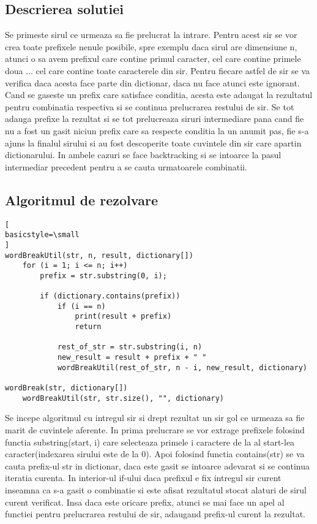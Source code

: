 \documentclass[runningheads]{llncs}
\begin{document}
\subsection{Descrierea solutiei}
Se primeste sirul ce urmeaza sa fie prelucrat la intrare. Pentru acest sir se vor crea toate prefixele nenule posibile, spre exemplu daca sirul
are dimensiune n, atunci o sa avem prefixul care contine primul caracter, cel care contine primele doua ... cel care contine toate caracterele
din sir. Pentru fiecare astfel de sir se va verifica daca acesta face parte din dictionar, daca nu face atunci este ignorant. Cand se gaseste
un prefix care satisface conditia, acesta este adaugat la rezultatul pentru combinatia respectiva si se continua prelucrarea restului de sir.
Se tot adauga prefixe la rezultat si se tot prelucreaza siruri intermediare pana cand fie nu a fost un gasit niciun prefix care sa respecte
conditia la un anumit pas, fie s-a ajuns la finalul sirului si au fost descoperite toate cuvintele din sir care apartin dictionarului. In ambele
cazuri se face backtracking si se intoarce la pasul intermediar precedent pentru a se cauta urmatoarele combinatii.
\subsection{Algoritmul de rezolvare}
\begin{lstlisting}[
basicstyle=\small
]
wordBreakUtil(str, n, result, dictionary[])
	for (i = 1; i <= n; i++)
		prefix = str.substring(0, i);

		if (dictionary.contains(prefix))
			if (i == n)
				print(result + prefix)
				return

			rest_of_str = str.substring(i, n)
			new_result = result + prefix + " "
			wordBreakUtil(rest_of_str, n - i, new_result, dictionary)

wordBreak(str, dictionary[])
	wordBreakUtil(str, str.size(), "", dictionary)
\end{lstlisting}
\vspace*{1em}
Se incepe algoritmul cu intregul sir si drept rezultat un sir gol ce urmeaza sa fie marit de cuvintele aferente. In prima 
prelucrare se vor extrage prefixele folosind functia substring(start, i) care selecteaza primele i caractere de la al start-lea
caracter(indexarea sirului este de la 0). Apoi folosind functia contains(str) se va cauta prefix-ul str in dictionar, daca este gasit se
intoarce adevarat si se continua iteratia curenta. In interior-ul if-ului daca prefixul e fix intregul sir curent inseamna ca s-a gasit o
combinatie si este afisat rezultatul stocat alaturi de sirul curent verificat. Insa daca este oricare prefix, atunci se
mai face un apel al functiei pentru prelucrarea restului de sir, adaugand prefix-ul curent la rezultat.
\end{document}
